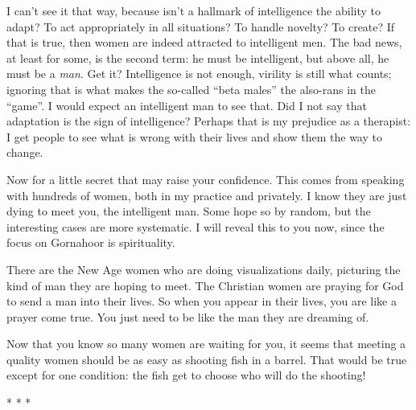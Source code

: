 I can't see it that way, because isn't a hallmark of intelligence the ability to adapt? To act appropriately in all situations? To handle novelty? To create? If that is true, then women are indeed attracted to intelligent men. The bad news, at least for some, is the second term: he must be intelligent, but above all, he must be a \emph{man}. Get it? Intelligence is not enough, virility is still what counts; ignoring that is what makes the so-called ``beta males'' the also-rans in the ``game''. I would expect an intelligent man to see that. Did I not say that adaptation is the sign of intelligence? Perhaps that is my prejudice as a therapist: I get people to see what is wrong with their lives and show them the way to change.

Now for a little secret that may raise your confidence. This comes from speaking with hundreds of women, both in my practice and privately. I know they are just dying to meet you, the intelligent man. Some hope so by random, but the interesting cases are more systematic. I will reveal this to you now, since the focus on Gornahoor is spirituality.

There are the New Age women who are doing visualizations daily, picturing the kind of man they are hoping to meet. The Christian women are praying for God to send a man into their lives. So when you appear in their lives, you are like a prayer come true. You just need to be like the man they are dreaming of.

Now that you know so many women are waiting for you, it seems that meeting a quality women should be as easy as shooting fish in a barrel. That would be true except for one condition: the fish get to choose who will do the shooting!



\begin{center}* * *\end{center}

